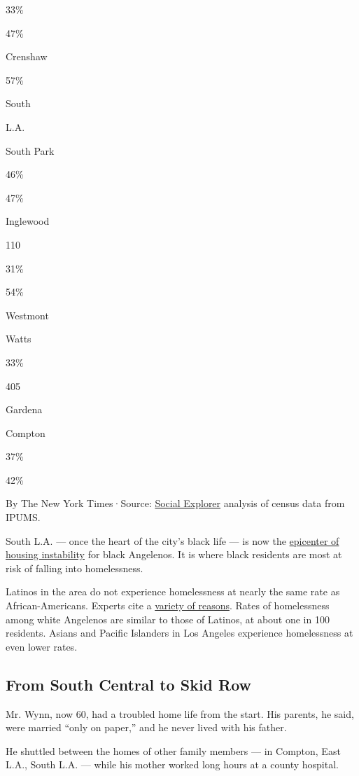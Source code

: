 33\%

47\%

Crenshaw

57\%

South

L.A.

South Park

46\%

47\%

Inglewood

110

31\%

54\%

Westmont

Watts

33\%

405

Gardena

Compton

37\%

42\%

By The New York Times·Source:
\href{https://www.socialexplorer.com/}{Social Explorer} analysis of
census data from IPUMS.

South L.A. --- once the heart of the city's black life --- is now the
\href{http://publichealth.lacounty.gov/ha/reports/LAHealthBrief2011/HousingHealth/SD_Housing_Fs.pdf}{epicenter
of housing instability} for black Angelenos. It is where black residents
are most at risk of falling into homelessness.

Latinos in the area do not experience homelessness at nearly the same
rate as African-Americans. Experts cite a
\href{https://dornsife.usc.edu/assets/sites/731/docs/RootsRaices_Full_Report_CSII_USC_Final2016_Web_Small.pdf}{variety
of reasons}. Rates of homelessness among white Angelenos are similar to
those of Latinos, at about one in 100 residents. Asians and Pacific
Islanders in Los Angeles experience homelessness at even lower rates.

\hypertarget{from-south-central-to-skid-row}{%
\subsection{From South Central to Skid
Row}\label{from-south-central-to-skid-row}}

Mr. Wynn, now 60, had a troubled home life from the start. His parents,
he said, were married ``only on paper,'' and he never lived with his
father.

He shuttled between the homes of other family members --- in Compton,
East L.A., South L.A. --- while his mother worked long hours at a county
hospital.

